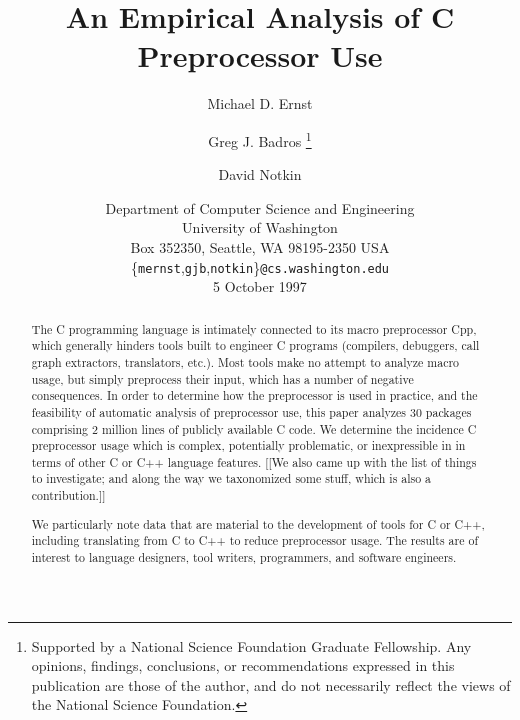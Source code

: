 \documentclass[10pt]{article}
\def\numpackages{30}
\def\numlines{2 million}
\begin{document}
% 


\title{An Empirical Analysis of C Preprocessor Use}

\author{Michael D. Ernst%
  \and Greg J. Badros%
  \thanks{Supported by a National Science Foundation
    Graduate Fellowship. Any opinions, findings, conclusions, or
    recommendations expressed in this publication are those of the
    author, and do not necessarily reflect the views of the National
    Science Foundation.}
  \and David Notkin}

\date{%
Department of Computer Science and Engineering \\
University of Washington \\
Box 352350, Seattle, WA  98195-2350  USA \\
{\small \{{\tt mernst},{\tt gjb},{\tt notkin}\}{\tt @cs.washington.edu}} \\
5 October 1997}  

\maketitle

\begin{abstract}
  The C programming language is intimately connected to its macro
  preprocessor Cpp, which generally hinders tools built to engineer C
  programs (compilers, debuggers, call graph extractors, translators,
  etc.).  Most tools make no attempt to analyze macro usage, but simply
  preprocess their input, which has a number of negative consequences.  In
  order to determine how the preprocessor is used in practice, and the
  feasibility of automatic analysis of preprocessor use, this paper
  analyzes {\numpackages} packages comprising {\numlines} lines of publicly
  available C code.  We determine the incidence C preprocessor usage which
  is complex, potentially problematic, or inexpressible in in terms of
  other C or C++ language features.
[[We also came up with the list of things to investigate; and along the way
we taxonomized some stuff, which is also a contribution.]]

  We particularly note data that are
  material to the development of tools for C or C++, including translating
  from C to C++ to reduce preprocessor usage.  The results are of interest
  to language designers, tool writers, programmers, and software engineers.
\end{abstract}
\end{document}
